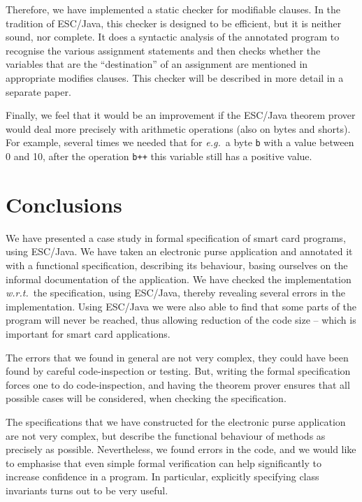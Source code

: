 \documentclass[a4paper]{llncs}
\begin{document}
Therefore, we have implemented a static checker for modifiable
clauses. In the tradition of ESC/Java, this checker is designed to be
efficient, but it is neither sound, nor complete. It does a syntactic
analysis of the annotated program to recognise the various assignment
statements and then checks whether the variables that are the
``destination'' of an assignment are mentioned in appropriate modifies
clauses. This checker will be described in more detail in a separate
paper.

Finally, we feel that it would be an improvement if the ESC/Java
theorem prover would deal more precisely with arithmetic operations
(also on bytes and shorts). For example, several times we needed that
for \emph{e.g.}~a byte \texttt{b} with a value between 0 and 10, after
the operation \texttt{b++} this variable still has a positive value.






\section{Conclusions}
\label{SectConcl}

We have presented a case study in formal specification of smart card
programs, using ESC/Java. We have taken an electronic purse
application and annotated it with a functional specification,
describing its behaviour, basing ourselves on the informal
documentation of the application. We have checked the implementation
\emph{w.r.t.}~the specification, using ESC/Java, thereby revealing
several errors in the implementation. Using ESC/Java we were also able 
to find that some parts of the program will never be reached, thus
allowing reduction of the code size -- which is important for smart
card applications. 

The errors that we found in general are not very complex, they could
have been found by careful code-inspection or testing. But, writing
the formal specification forces one to do code-inspection, and having
the theorem prover ensures that all possible cases will be
considered, when checking the specification.

The specifications that we have constructed for the electronic purse
application are not very complex, but describe the functional
behaviour of methods as precisely as possible. Nevertheless, we found
errors in the code, and we would like to emphasise that even simple
formal verification can help significantly to increase confidence in a
program. In particular, explicitly specifying class invariants turns
out to be very useful.
\end{document}
